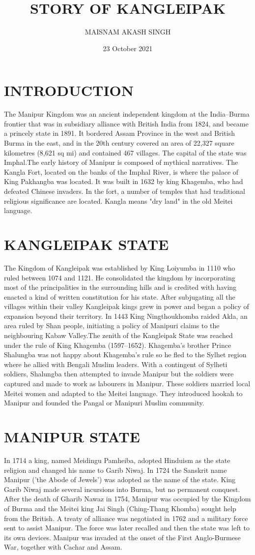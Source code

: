 \documentclass[10pt,a4 paper,two coloum] {article}
\title{STORY OF KANGLEIPAK}
\author{MAISNAM AKASH SINGH}
\date{23 October 2021}
\begin{document}
 \maketitle
 \section{INTRODUCTION}
The Manipur Kingdom was an ancient independent kingdom at the India–Burma frontier that was in subsidiary alliance with British India from 1824, and became a princely state in 1891. It bordered Assam Province in the west and British Burma in the east, and in the 20th century covered an area of 22,327 square kilometres (8,621 sq mi) and contained 467 villages. The capital of the state was Imphal.The early history of Manipur is composed of mythical narratives. The Kangla Fort, located on the banks of the Imphal River, is where the palace of King Pakhangba was located. It was built in 1632 by king Khagemba, who had defeated Chinese invaders. In the fort, a number of temples that had traditional religious significance are located. Kangla means "dry land" in the old Meitei language.
\section{KANGLEIPAK STATE}
The Kingdom of Kangleipak was established by King Loiyumba in 1110 who ruled between 1074 and 1121. He consolidated the kingdom by incorporating most of the principalities in the surrounding hills and is credited with having enacted a kind of written constitution for his state. After subjugating all the villages within their valley Kangleipak kings grew in power and began a policy of expansion beyond their territory. In 1443 King Ningthoukhomba raided Akla, an area ruled by Shan people, initiating a policy of Manipuri claims to the neighbouring Kabaw Valley.The zenith of the Kangleipak State was reached under the rule of King Khagemba (1597–1652). Khagemba's brother Prince Shalungba was not happy about Khagemba's rule so he fled to the Sylhet region where he allied with Bengali Muslim leaders. With a contingent of Sylheti soldiers, Shalungba then attempted to invade Manipur but the soldiers were captured and made to work as labourers in Manipur. These soldiers married local Meitei women and adapted to the Meitei language. They introduced hookah to Manipur and founded the Pangal or Manipuri Muslim community.
\section {MANIPUR STATE}
In 1714 a king, named Meidingu Pamheiba, adopted Hinduism as the state religion and changed his name to Garib Niwaj. In 1724 the Sanskrit name Manipur ('the Abode of Jewels') was adopted as the name of the state. King Garib Niwaj made several incursions into Burma, but no permanent conquest. After the death of Gharib Nawaz in 1754, Manipur was occupied by the Kingdom of Burma and the Meitei king Jai Singh (Ching-Thang Khomba) sought help from the British. A treaty of alliance was negotiated in 1762 and a military force sent to assist Manipur. The force was later recalled and then the state was left to its own devices. Manipur was invaded at the onset of the First Anglo-Burmese War, together with Cachar and Assam.
\end{document}
